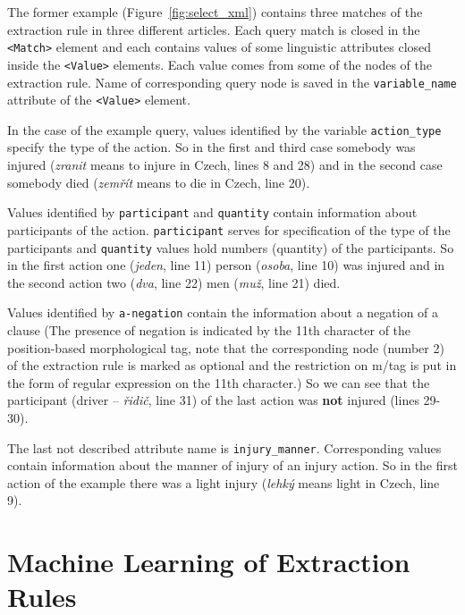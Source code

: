 The former example (Figure~\ref{fig:select_xml}) contains three matches of the extraction rule in three different articles. Each query match is closed in the \verb+<Match>+ element and each contains values of some linguistic attributes closed inside the \verb+<Value>+ elements. Each value comes from some of the nodes of the extraction rule. Name of corresponding query node is saved in the \verb+variable_name+ attribute of the \verb+<Value>+ element.

In the case of the example query, values identified by the variable \verb+action_type+ specify the type of the action. So in the first and third case somebody was injured (\emph{zranit} means to injure in Czech, lines 8 and 28) and in the second case somebody died (\emph{zemřít} means to die in Czech, line 20).

Values identified by \verb+participant+ and \verb+quantity+ contain information about participants of the action. \verb+participant+ serves for specification of the type of the participants and \verb+quantity+ values hold numbers (quantity) of the participants. So in the first action one (\emph{jeden}, line 11) person (\emph{osoba}, line 10) was injured and in the second action two (\emph{dva}, line 22) men (\emph{muž}, line 21) died.

Values identified by \verb+a-negation+ contain the information about a negation of a clause (The presence of negation is indicated by the 11th character of the position-based morphological tag, note that the corresponding node (number 2) of the extraction rule is marked as optional and the restriction on m/tag is put in the form of regular expression on the 11th character.) So we can see that the participant (driver -- \emph{řidič}, line 31) of the last action was \textbf{not} injured (lines 29-30).

The last not described attribute name is \verb+injury_manner+. Corresponding values contain information about the manner of injury of an injury action. So in the first action of the example there was a light injury (\emph{lehký} means light in Czech, line 9).








\section{Machine Learning of Extraction Rules} \graphicspath{{../img/ch60/}} \label{sec:impl_learning}



